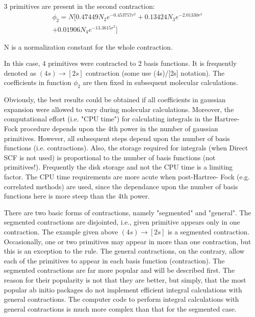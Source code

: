 3 primitives are present in the second contraction:
\begin{multline}\label{}
  \phi_{2} = N[0.47449N_{2}e^{-0.453757r^{2}} +
  0.13424N_{3}e^{-2.01330r^{2}} \\
  + 0.01906N_{4}e^{-13.3615r^{2}}]
\end{multline}

N is a normalization constant for the whole contraction.

In this case, 4 primitives were contracted to 2 basis functions. It is
frequently denoted as $(4s) \rightarrow [2s]$ contraction (some use
(4s)/[2s] notation). The coefficients in function $\phi_{2}$ are then
fixed in subsequent molecular calculations.

Obviously, the best results could be obtained if all coefficients in
gaussian expansion were allowed to vary during molecular
calculations. Moreover, the computational effort (i.e. "CPU time") for
calculating integrals in the Hartree-Fock procedure depends upon the
4th power in the number of gaussian primitives. However, all
subsequent steps depend upon the number of basis functions (i.e.
contractions). Also, the storage required for integrals (when Direct
SCF is not used) is proportional to the number of basis functions (not
primitives!). Frequently the disk storage and not the CPU time is a
limiting factor. The CPU time requirements are more acute when
post-Hartree- Fock (e.g. correlated methods) are used, since the
dependance upon the number of basis functions here is more steep than
the 4th power.

There are two basic forms of contractions, namely "segmented" and
"general". The segmented contractions are disjointed, i.e., given
primitive appears only in one contraction. The example given above
$(4s) \rightarrow [2s]$ is a segmented contraction. Occasionally, one
or two primitives may appear in more than one contraction, but this is
an exception to the rule. The general contractions, on the contrary,
allow each of the primitives to appear in each basis function
(contraction). The segmented contractions are far more popular and
will be described first. The reason for their popularity is not that
they are better, but simply, that the most popular ab initio packages
do not implement efficient integral calculations with general
contractions. The computer code to perform integral calculations with
general contractions is much more complex than that for the segmented
case.


